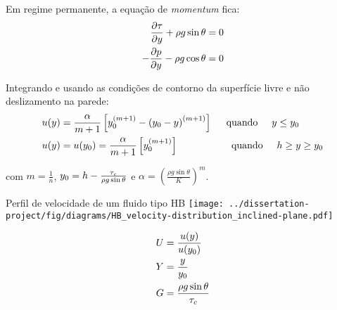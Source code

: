 \begin{frame}
    \hspace{0.5cm} Em regime permanente, a equação de \textit{momentum} fica:
    \begin{equation}
        \begin{split}
            \frac{\partial \tau}{\partial y} + \rho g \sin{\theta} &= 0 \\
            -\frac{\partial p}{\partial y} - \rho g \cos{\theta} &= 0
        \end{split}
        \label{eq:motion_steady_state_partial}
    \end{equation}

    \hspace{0.5cm} Integrando e usando as condições de contorno da superfície livre e não deslizamento na parede:
    \begin{equation}
        \begin{split}
            u(y) &= \frac{\alpha}{m+1} \left[y_0^{(m+1)} - {(y_0-y)}^{(m+1)}\right]
            \hspace{0.5cm} \text{quando} \hspace{0.5cm} y \leq y_0
            \\
            u(y) &= u(y_0) = \frac{\alpha}{m+1} \left[ y_0^{(m+1)} \right]
            \hspace{1.9cm} \text{quando} \hspace{0.5cm} h \geq y \geq y_0
        \end{split}
        \label{eq:velocity_distribution}
    \end{equation}
    
    com $m=\frac{1}{n}$, $y_0 = h - \frac{\tau_c}{\rho g \sin{\theta}}$ e $\alpha = \left({\frac{\rho g \sin{\theta}}{K}}\right)^m$.
\end{frame}

\begin{frame}
    \begin{minipage}[c]{0.65\textwidth}
        \begin{exampleblock}{Perfil de velocidade de um fluido tipo HB}
            \centering
            \texttt{[image: ../dissertation-project/fig/diagrams/HB\_velocity-distribution\_inclined-plane.pdf]}
        \end{exampleblock}
    \end{minipage}
    \hfill
    \begin{minipage}[t]{0.32\textwidth}
        \small
        \begin{equation}
            \begin{split}
                U &= \frac{u(y)}{u(y_0)} \\
                Y &= \frac{y}{y_0} \\
                G &= \frac{\rho g \sin{\theta}}{\tau_c}
            \end{split}
            \label{eq:dimensionaless_velocity_distribution}
        \end{equation}        
    \end{minipage}
\end{frame}
